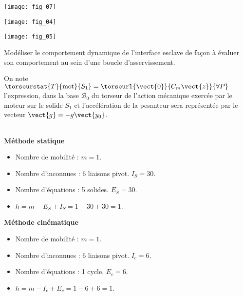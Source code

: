 \begin{center}
\texttt{[image: fig\_07]}
\end{center}

\begin{marginfigure}[-8cm]
\texttt{[image: fig\_04]}
\end{marginfigure}

\begin{marginfigure}[-4cm]
\texttt{[image: fig\_05]}
\end{marginfigure}


\fi

\begin{obj}
Modéliser le comportement dynamique de l’interface esclave de façon à évaluer son
comportement au sein d’une boucle d’asservissement.
\end{obj}

\ifprof
\else

On note $\torseurstat{T}{\text{mot}}{S_1}=\torseurl{\vect{0}}{C_m\vect{z}}{\forall P}$ l’expression, dans la base $\mathcal{B}_0$ du torseur de l’action mécanique exercée par le moteur sur le solide $S_1$ et
l’accélération de la pesanteur sera représentée par le vecteur $\vect{g} = -g \vect{y_0}$.

\fi
{}
\ifprof
\begin{corrige}~\\

\textbf{Méthode statique}
\begin{itemize}
\item Nombre de mobilité : $m=1$.
\item Nombre d'inconnues : 6 liaisons pivot. $I_S=30$. 
\item Nombre d'équations : 5 solides. $E_S = 30$. 
\item $h=m-E_S+I_S = 1-30+30=1$. 
\end{itemize}

\textbf{Méthode cinématique}

\begin{itemize}
\item Nombre de mobilité : $m=1$.
\item Nombre d'inconnues : 6 liaisons pivot. $I_c=6$. 
\item Nombre d'équations : 1 cycle. $E_c = 6$. 
\item $h=m-I_c+E_c = 1-6+6=1$. 
\end{itemize}

\end{corrige}
\else
\fi


